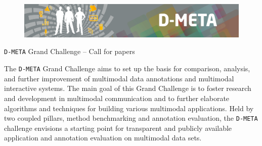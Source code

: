 \documentclass[a4paper]{article}
\begin{document}
\begin{figure}
\vspace{-3.3cm}
\hspace{-2.2cm}
\includegraphics[width=1.25\textwidth]{Banner.jpg}\vspace{0.2cm}\\
\end{figure}


\begin{center}
{\LARGE
\texttt{D-META} Grand Challenge -- Call for papers
} 
\end{center}
\vspace{0.5cm}





\begin{center}
\begin{minipage}{0.92\textwidth}
{\small
The \texttt{D-META} Grand Challenge aims to set up the basis for comparison, analysis, and further improvement of
multimodal data annotations and multimodal interactive systems. The main goal of this Grand Challenge is to foster
research and development in multimodal communication and to further elaborate algorithms and techniques for building
various multimodal applications. Held by two coupled pillars, method benchmarking and annotation evaluation, the
\texttt{D-META} challenge envisions a starting point for transparent and publicly available application and annotation
evaluation on multimodal data sets.}
\end{minipage}
\end{center}
\vspace{0.5cm}
\end{document}

